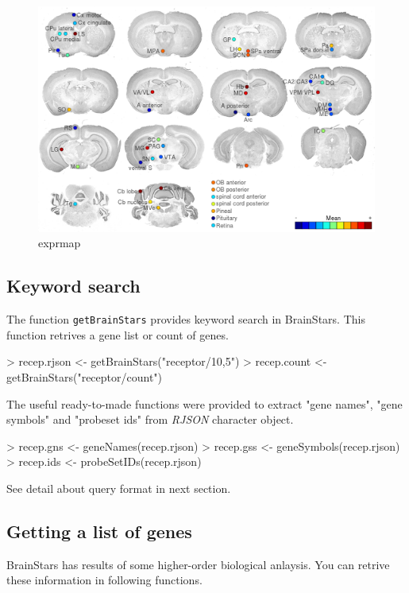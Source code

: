 \documentclass[12pt,fullpage]{article}
\newcommand{\Rfunction}[1]{{\texttt{#1}}}
\newcommand{\Rpackage}[1]{{\textit{#1}}}
\begin{document}
\begin{figure}
  \centering
  \includegraphics{exprmap.png}
  \caption{exprmap}
\end{figure}

\subsection{Keyword search}
The function \Rfunction{getBrainStars} provides keyword search in BrainStars. This function retrives a gene list or count of genes.
\begin{Schunk}
\begin{Sinput}
> recep.rjson <- getBrainStars("receptor/10,5")
> recep.count <- getBrainStars("receptor/count")
\end{Sinput}
\end{Schunk}
The useful ready-to-made functions were provided to extract "gene names", "gene symbols" and "probeset ids" from \Rpackage{RJSON} character object.
\begin{Schunk}
\begin{Sinput}
> recep.gns <- geneNames(recep.rjson)
> recep.gss <- geneSymbols(recep.rjson)
> recep.ids <- probeSetIDs(recep.rjson)
\end{Sinput}
\end{Schunk}
See detail about query format in next section.

\subsection{Getting a list of genes}
BrainStars has results of some higher-order biological anlaysis. You can retrive these information in following functions.
\end{document}
